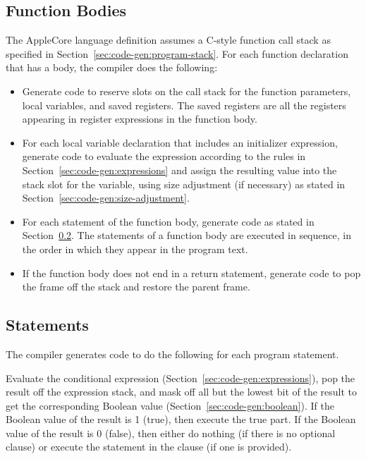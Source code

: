 \documentclass[10pt]{article}
\begin{document}
\subsection{Function Bodies}
\label{sec:code-gen:fn-bodies}

The AppleCore language definition assumes a C-style function call
stack as specified in Section~\ref{sec:code-gen:program-stack}.  For
each function declaration that has a body, the compiler does the
following:
%
\begin{itemize}
%
\item Generate code to reserve slots on the call stack for the
  function parameters, local variables, and saved registers.  The
  saved registers are all the registers appearing in register
  expressions in the function body.
%
\item For each local variable declaration that includes an initializer
  expression, generate code to evaluate the expression according to
  the rules in Section~\ref{sec:code-gen:expressions} and assign the
  resulting value into the stack slot for the variable, using size
  adjustment (if necessary) as stated in
  Section~\ref{sec:code-gen:size-adjustment}.
%
\item For each statement of the function body, generate code as stated
  in Section~\ref{sec:code-gen:statements}.  The statements of a
  function body are executed in sequence, in the order in which they
  appear in the program text.
%
\item If the function body does not end in a return statement,
  generate code to pop the frame off the stack and restore the parent
  frame.
%
\end{itemize}


\subsection{Statements}
\label{sec:code-gen:statements}

The compiler generates code to do the following for each program
statement.

 Evaluate the conditional expression
(Section~\ref{sec:code-gen:expressions}), pop the result off the
expression stack, and mask off all but the lowest bit of the result to
get the corresponding Boolean value
(Section~\ref{sec:code-gen:boolean}).  If the Boolean value of the
result is 1 (true), then execute the true part.  If the Boolean value
of the result is 0 (false), then either do nothing (if there is no
optional  clause) or execute the statement in the 
clause (if one is provided).
\end{document}
